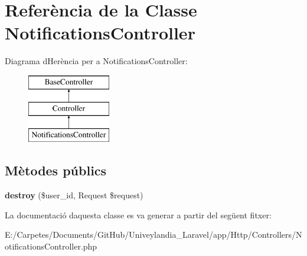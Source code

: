 \hypertarget{class_app_1_1_http_1_1_controllers_1_1_notifications_controller}{}\section{Referència de la Classe Notifications\+Controller}
\label{class_app_1_1_http_1_1_controllers_1_1_notifications_controller}
Diagrama d\textquotesingle{}Herència per a Notifications\+Controller\+:\begin{figure}[H]
\begin{center}
\leavevmode
\includegraphics[height=3.000000cm]{class_app_1_1_http_1_1_controllers_1_1_notifications_controller}
\end{center}
\end{figure}
\subsection*{Mètodes públics}
\begin{DoxyCompactItemize}
\item 
\mbox{\label{class_app_1_1_http_1_1_controllers_1_1_notifications_controller_aed41f1a1062a19af18fbdc5fc3a3834b}} 
{\bfseries destroy} (\$user\+\_\+id, Request \$request)
\end{DoxyCompactItemize}


La documentació d\textquotesingle{}aquesta classe es va generar a partir del següent fitxer\+:\begin{DoxyCompactItemize}
\item 
E\+:/\+Carpetes/\+Documents/\+Git\+Hub/\+Univeylandia\+\_\+\+Laravel/app/\+Http/\+Controllers/Notifications\+Controller.\+php\end{DoxyCompactItemize}
